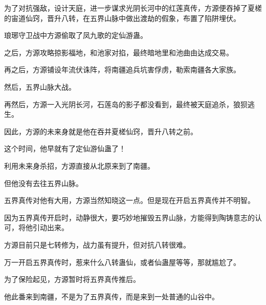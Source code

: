 \begin{this_body}
为了对抗强敌，设计天庭，进一步谋求光阴长河中的红莲真传，方源便吞掉了夏槎的宙道仙窍，晋升八转，在五界山脉中做出渡劫的假象，布置了陷阱埋伏。

琅琊守卫战中方源偷取了凤九歌的定仙游蛊。

之后，方源攻略掠影福地，和池家对掐，最终暗地里和池曲由达成交易。

再之后，方源铺设年流伏诛阵，将南疆追兵坑害俘虏，勒索南疆各大家族。

然后，五界山脉大战。

再然后，方源一入光阴长河，石莲岛的影子都没看到，最终被天庭追杀，狼狈逃生。

因此，方源的未来身就是他在吞并夏槎仙窍，晋升八转之前。

这个时间，他早就有了定仙游仙蛊了！

利用未来身杀招，方源直接从北原来到了南疆。

但他没有去往五界山脉。

五界真传对他有大用，方源当然知晓这一点。但是现在开启五界真传并不明智。

因为五界真传开启时，动静很大，要巧妙地摧毁五界山脉，方能得到陶铸意志的认可，将他引动出来。

方源目前只是七转修为，战力虽有提升，但对抗八转很难。

万一开启五界真传时，惹来什么八转蛊仙，或者仙蛊屋等等，那就尴尬了。

为了保险起见，方源暂时将五界真传推后。

他此番来到南疆，不是为了五界真传，而是来到一处普通的山谷中。

\end{this_body}

